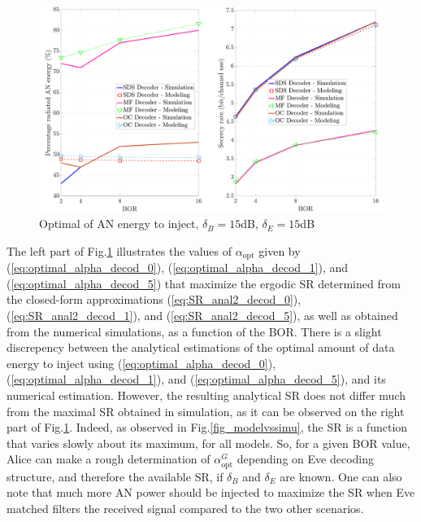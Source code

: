 \documentclass[journal,comsoc]{IEEEtran}
\let\MYoriglatexcaption\caption
\renewcommand{\caption}[2][\relax]{\MYoriglatexcaption[#2]{#2}}
\begin{document}
\begin{figure}[h!t]
	\centering
	\includegraphics[width=1\linewidth]{graphs/optimal_alpha_15dB.pdf}
	\caption{Optimal of AN energy to inject, $\delta_B = 15$dB,  $\delta_E = 15$dB}
	\label{fig_optimalAN}
\end{figure}
The left part of Fig.\ref{fig_optimalAN} illustrates the values of $\alpha_{\text{opt}}$ given by (\ref{eq:optimal_alpha_decod_0}), (\ref{eq:optimal_alpha_decod_1}), and (\ref{eq:optimal_alpha_decod_5}) that maximize the  ergodic SR determined from the closed-form approximations (\ref{eq:SR_anal2_decod_0}), (\ref{eq:SR_anal2_decod_1}), and (\ref{eq:SR_anal2_decod_5}), as well as obtained from the numerical simulations, as a function of the BOR. There is a slight discrepency between the analytical estimations of the optimal amount of data energy to inject using (\ref{eq:optimal_alpha_decod_0}), (\ref{eq:optimal_alpha_decod_1}), and (\ref{eq:optimal_alpha_decod_5}), and its numerical estimation. However, the resulting analytical SR does not differ much from the maximal SR obtained in simulation, as it can be observed on the right part of Fig.\ref{fig_optimalAN}. Indeed, as observed in Fig.\ref{fig_modelvssimu}, the SR is a function that varies slowly about its maximum, for all models. So, for a given BOR value, Alice can make a rough determination of $\alpha_{\text{opt}}^G$ depending on Eve decoding structure, and therefore the available SR, if $\delta_B$ and $\delta_E$ are known. One can also note that much more AN power should be injected to maximize the SR when Eve matched filters the received signal compared to the two other scenarios.
\end{document}
